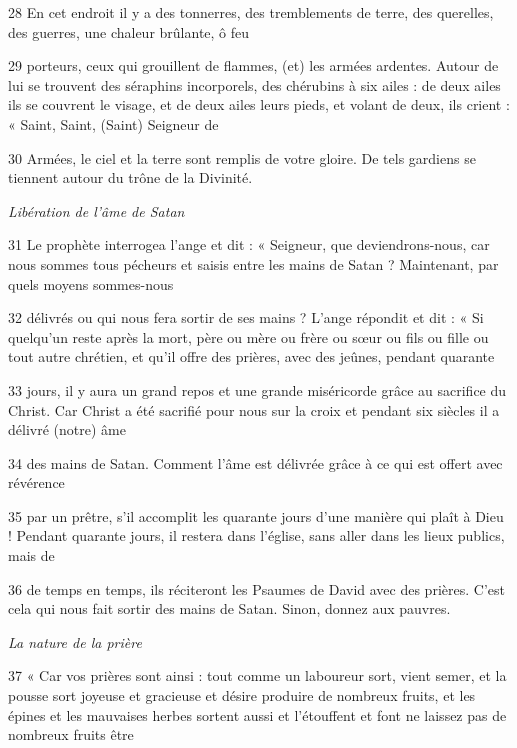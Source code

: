 \par 28 En cet endroit il y a des tonnerres, des tremblements de terre, des querelles, des guerres, une chaleur brûlante, ô feu

\par 29 porteurs, ceux qui grouillent de flammes, (et) les armées ardentes. Autour de lui se trouvent des séraphins incorporels, des chérubins à six ailes : de deux ailes ils se couvrent le visage, et de deux ailes leurs pieds, et volant de deux, ils crient : « Saint, Saint, (Saint) Seigneur de

\par 30 Armées, le ciel et la terre sont remplis de votre gloire. De tels gardiens se tiennent autour du trône de la Divinité.

\par \textit{Libération de l'âme de Satan}

\par 31 Le prophète interrogea l'ange et dit : « Seigneur, que deviendrons-nous, car nous sommes tous pécheurs et saisis entre les mains de Satan ? Maintenant, par quels moyens sommes-nous

\par 32 délivrés ou qui nous fera sortir de ses mains ? L'ange répondit et dit : « Si quelqu'un reste après la mort, père ou mère ou frère ou sœur ou fils ou fille ou tout autre chrétien, et qu'il offre des prières, avec des jeûnes, pendant quarante

\par 33 jours, il y aura un grand repos et une grande miséricorde grâce au sacrifice du Christ. Car Christ a été sacrifié pour nous sur la croix et pendant six siècles il a délivré (notre) âme

\par 34 des mains de Satan. Comment l'âme est délivrée grâce à ce qui est offert avec révérence

\par 35 par un prêtre, s'il accomplit les quarante jours d'une manière qui plaît à Dieu ! Pendant quarante jours, il restera dans l'église, sans aller dans les lieux publics, mais de

\par 36 de temps en temps, ils réciteront les Psaumes de David avec des prières. C’est cela qui nous fait sortir des mains de Satan. Sinon, donnez aux pauvres.

\par \textit{La nature de la prière}

\par 37 « Car vos prières sont ainsi : tout comme un laboureur sort, vient semer, et la pousse sort joyeuse et gracieuse et désire produire de nombreux fruits, et les épines et les mauvaises herbes sortent aussi et l'étouffent et font ne laissez pas de nombreux fruits être

